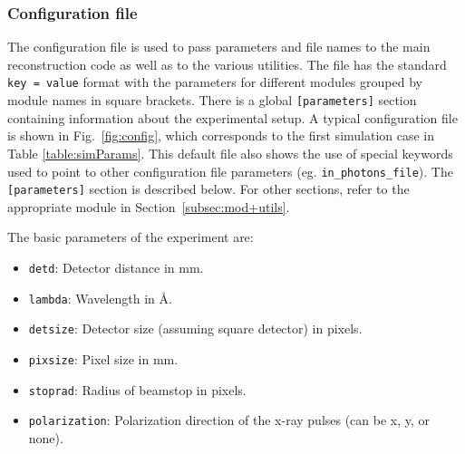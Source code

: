 \documentclass[preprint]{iucr}              %
\begin{document}
\subsubsection{Configuration file}\label{subsubsec:config}
The configuration file is used to pass parameters and file names to the main reconstruction code as well as to the various utilities. The file has the standard \texttt{key = value} format with the parameters for different modules grouped by module names in square brackets. There is a global \texttt{[parameters]} section containing information about the experimental setup. A typical configuration file is shown in Fig.~\ref{fig:config}, which corresponds to the first simulation case in Table \ref{table:simParams}. This default file also shows the use of special keywords used to point to other configuration file parameters (eg. \texttt{in\_photons\_file}). The \texttt{[parameters]} section is described below. For other sections, refer to the appropriate module in Section~\ref{subsec:mod+utils}.

The basic parameters of the experiment are:
\begin{itemize}
\item \texttt{detd}: Detector distance in mm.
\item \texttt{lambda}: Wavelength in \AA.
\item \texttt{detsize}: Detector size (assuming square detector) in pixels.
\item \texttt{pixsize}: Pixel size in mm.
\item \texttt{stoprad}: Radius of beamstop in pixels.
\item \texttt{polarization}: Polarization direction of the x-ray pulses (can be x, y, or none).
\end{itemize}
\end{document}
